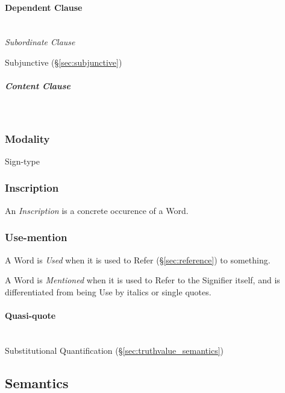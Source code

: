 \paragraph{Dependent Clause}\label{sec:dependent_clause}\hfill \\

\emph{Subordinate Clause}

Subjunctive (\S\ref{sec:subjunctive})

\subparagraph{Content Clause}\label{sec:content_clause}\hfill \\



\subsubsection{Modality}\label{sec:modality}

Sign-type



\subsubsection{Inscription}\label{sec:inscription}

An \emph{Inscription} is a concrete occurence of a Word.



\subsubsection{Use-mention}\label{sec:use_mention}

A Word is \emph{Used} when it is used to Refer (\S\ref{sec:reference})
to something.

A Word is \emph{Mentioned} when it is used to Refer to the Signifier
itself, and is differentiated from being Use by italics or single
quotes.



\paragraph{Quasi-quote}\label{sec:quasi_quote}
\hfill \\

Substitutional Quantification (\S\ref{sec:truthvalue_semantics})



\subsection{Semantics}\label{sec:semantics}

